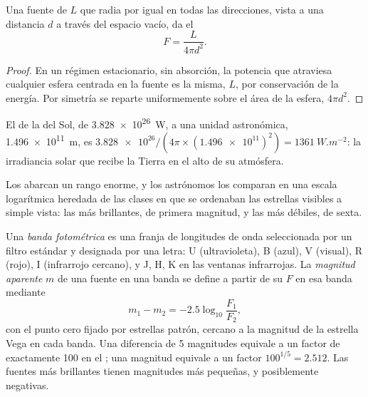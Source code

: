 \begin{proposition}\label{prop:b1:observing-the-sky:inverse-square}
Una fuente de  $L$ que radia por igual en todas las direcciones, vista a una
distancia $d$ a través del espacio vacío, da el 
\[
  F = \frac{L}{4\pi d^2} .
\]
\end{proposition}

\begin{proof}
En un régimen estacionario, sin absorción, la potencia que atraviesa cualquier esfera
centrada en la fuente es la misma, $L$, por conservación de la energía. Por simetría se
reparte uniformemente sobre el área de la esfera, $4\pi d^2$.
\end{proof}

\begin{example}
El  de la  del Sol, de \qty{3.828e26}{W}, a una unidad astronómica,
\qty{1.496e11}{m}, es $\num{3.828e26}/(4\pi\times
(\num{1.496e11})^2) = \qty{1361}{W.m^{-2}}$: la irradiancia solar que recibe la Tierra en
el alto de su atmósfera.
\end{example}

Los  abarcan un rango enorme, y los astrónomos los comparan en una escala
logarítmica heredada de las clases en que se ordenaban las estrellas visibles a simple
vista: las más brillantes, de primera magnitud, y las más débiles, de sexta.

\begin{definition}\label{def:b1:observing-the-sky:magnitude}
Una \emph{banda fotométrica} es una franja de longitudes de onda
seleccionada por un filtro estándar y designada por una letra: U (ultravioleta), B (azul),
V (visual), R (rojo), I (infrarrojo cercano), y J, H, K en las ventanas infrarrojas. La
\emph{magnitud aparente} $m$ de una fuente en una banda se define
a partir de su  $F$ en esa banda mediante
\[
  m_1 - m_2 = -2.5\log_{10}\frac{F_1}{F_2} ,
\]
con el punto cero fijado por estrellas patrón, cercano a la magnitud de la estrella Vega
en cada banda. Una diferencia de 5 magnitudes equivale a un factor de exactamente 100 en el
; una magnitud equivale a un factor $100^{1/5} = 2.512$. Las fuentes más brillantes
tienen magnitudes más pequeñas, y posiblemente negativas.
\end{definition}

